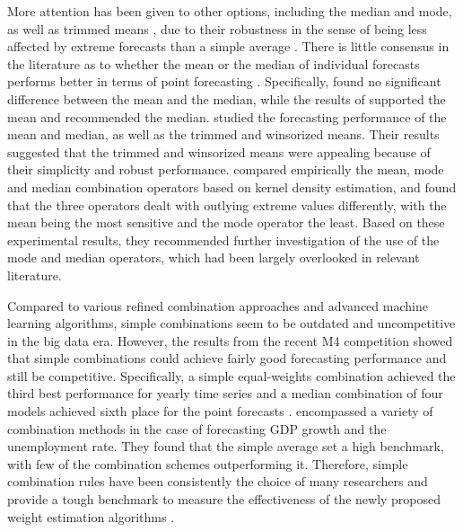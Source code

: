 \documentclass[11pt]{article}
\begin{document}
More attention has been given to other options, including the median and mode, as well as trimmed means \citep[e.g.,][]{Chan1999-io,Stock2004-rq,Genre2013-ut,Jose2014-uh,Grushka-Cockayne2017-dj}, due to their robustness in the sense of being less affected by extreme forecasts than a simple average \citep{Lichtendahl2020-ut}. There is little consensus in the literature as to whether the mean or the median of individual forecasts performs better in terms of point forecasting \citep{Kolassa2011-ai}. Specifically, \cite{McNees1992-qc} found no significant difference between the mean and the median, while the results of \cite{Stock2004-rq} supported the mean and \cite{Agnew1985-dj} recommended the median. \cite{Jose2008-vm} studied the forecasting performance of the mean and median, as well as the trimmed and winsorized means. Their results suggested that the trimmed and winsorized means were appealing because of their simplicity and robust performance. \cite{Kourentzes2014-hs} compared empirically the mean, mode and median combination operators based on kernel density estimation, and found that the three operators dealt with outlying extreme values differently, with the mean being the most sensitive and the mode operator the least. Based on these experimental results, they recommended further investigation of the use of the mode and median operators, which had been largely overlooked in relevant literature.

Compared to various refined combination approaches and advanced machine learning algorithms, simple combinations seem to be outdated and uncompetitive in the big data era. However, the results from the recent M4 competition \citep{Makridakis2020-hu} showed that simple combinations could achieve fairly good forecasting performance and still be competitive. Specifically, a simple equal-weights combination achieved the third best performance for yearly time series \citep{Shaub2019-on} and a median combination of four models achieved sixth place for the point forecasts \citep{Petropoulos2020-fp}. \cite{Genre2013-ut} encompassed a variety of combination methods in the case of forecasting GDP growth and the unemployment rate. They found that the simple average set a high benchmark, with few of the combination schemes outperforming it. Therefore, simple combination rules have been consistently the choice of many researchers and provide a tough benchmark to measure the effectiveness of the newly proposed weight estimation algorithms \citep[e.g.,][]{Makridakis2000-he,Stock2004-rq,Makridakis2020-hu,Montero-Manso2020-tq,Kang2020-rl,Wang2021-un}.
\end{document}
